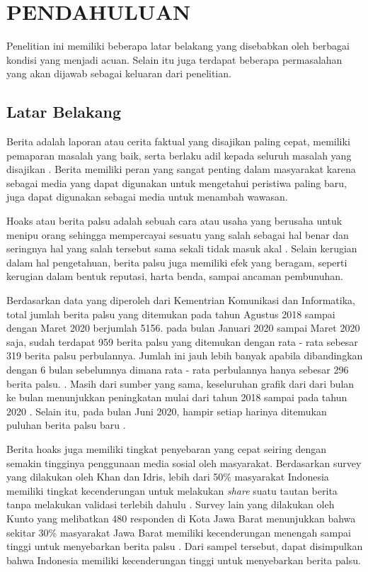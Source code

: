 \chapter{PENDAHULUAN}
\label{chap:pendahuluan}


Penelitian ini memiliki beberapa latar belakang yang disebabkan oleh berbagai kondisi yang menjadi acuan. Selain itu juga terdapat beberapa permasalahan yang akan dijawab sebagai keluaran dari penelitian.

\section{Latar Belakang}
\label{sec:latarbelakang}

Berita adalah laporan atau cerita faktual yang disajikan paling cepat, memiliki pemaparan masalah yang baik, serta berlaku adil kepada seluruh masalah yang disajikan \cite{rani2013persepsi}. Berita memiliki peran yang sangat penting dalam masyarakat karena sebagai media yang dapat digunakan untuk mengetahui peristiwa paling baru, juga dapat digunakan sebagai media untuk menambah wawasan.

Hoaks atau berita palsu adalah sebuah cara atau usaha yang berusaha untuk menipu orang sehingga mempercayai sesuatu yang salah sebagai hal benar dan seringnya hal yang salah tersebut sama sekali tidak masuk akal \cite{berita_bohong}. Selain kerugian dalam hal pengetahuan, berita palsu juga memiliki efek yang beragam, seperti kerugian dalam bentuk reputasi, harta benda, sampai ancaman pembunuhan.

Berdasarkan data yang diperoleh dari Kementrian Komunikasi dan Informatika, total jumlah berita palsu yang ditemukan pada tahun Agustus 2018 sampai dengan Maret 2020 berjumlah 5156. pada bulan Januari 2020 sampai Maret 2020 saja, sudah terdapat 959 berita palsu yang ditemukan dengan rata - rata sebesar 319 berita palsu perbulannya. Jumlah ini jauh lebih banyak apabila dibandingkan dengan 6 bulan sebelumnya dimana rata - rata perbulannya hanya sebesar 296 berita palsu. \cite{kominfoStatHoax}. Masih dari sumber yang sama, keseluruhan grafik dari dari bulan ke bulan menunjukkan peningkatan mulai dari tahun 2018 sampai pada tahun 2020 \cite{kominfoStatHoax}. Selain itu, pada bulan Juni 2020, hampir setiap harinya ditemukan puluhan berita palsu baru \cite{kominfoJuni2020}.

Berita hoaks juga memiliki tingkat penyebaran yang cepat seiring dengan semakin tingginya penggunaan media sosial oleh masyarakat. Berdasarkan survey yang dilakukan oleh Khan dan Idris, lebih dari 50\% masyarakat Indonesia memiliki tingkat kecenderungan untuk melakukan \textit{share} suatu tautan berita tanpa melakukan validasi terlebih dahulu \cite{khan}. Survey lain yang dilakukan oleh Kunto yang melibatkan 480 responden di Kota Jawa Barat menunjukkan bahwa sekitar 30\% masyarakat Jawa Barat memiliki kecenderungan menengah sampai tinggi untuk menyebarkan berita palsu \cite{kuntoUmur}. Dari sampel tersebut, dapat disimpulkan bahwa Indonesia memiliki kecenderungan tinggi untuk menyebarkan berita palsu.

